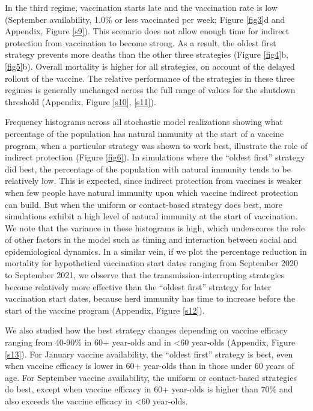 In the third regime, vaccination starts late and the vaccination rate is low (September availability, 1.0\% or less vaccinated per week; Figure \ref{fig3}d and Appendix, Figure \ref{s9}). This scenario does not allow enough time for indirect protection from vaccination to become strong.  As a result, the oldest first strategy prevents more deaths than the other three strategies (Figure \ref{fig4}b, \ref{fig5}b).  Overall mortality is higher for all strategies, on account of the delayed rollout of the vaccine.  The relative performance of the strategies in these three regimes is generally unchanged across the full range of values for the shutdown threshold (Appendix, Figure \ref{s10}, \ref{s11}).  

Frequency histograms across all stochastic model realizations showing what percentage of the population has natural immunity at the start of a vaccine program, when a particular strategy was shown to work best, illustrate the role of indirect protection (Figure \ref{fig6}). In simulations where the “oldest first” strategy did best, the percentage of the population with natural immunity tends to be relatively low. This is expected, since indirect protection from vaccines is weaker when few people have natural immunity upon which vaccine indirect protection can build.  But when the uniform or contact-based strategy does best, more simulations exhibit a high level of natural immunity at the start of vaccination.  We note that the variance in these histograms is high, which underscores the role of other factors in the model such as timing and interaction between social and epidemiological dynamics. In a similar vein, if we plot the percentage reduction in mortality for hypothetical vaccination start dates ranging from September 2020 to September 2021, we observe that the transmission-interrupting strategies become relatively more effective than the “oldest first” strategy for later vaccination start dates, because herd immunity has time to increase before the start of the vaccine program (Appendix, Figure \ref{s12}). 

We also studied how the best strategy changes depending on vaccine efficacy ranging from 40-90\% in 60+ year-olds and in <60 year-olds (Appendix, Figure \ref{s13}).  For January vaccine availability, the “oldest first” strategy is best, even when vaccine efficacy is lower in 60+ year-olds than in those under 60 years of age.  For September vaccine availability, the uniform or contact-based strategies do best, except when vaccine efficacy in 60+ year-olds is higher than 70\% and also exceeds the vaccine efficacy in <60 year-olds. 

